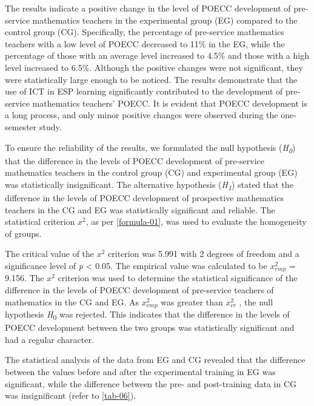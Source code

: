 The results indicate a positive change in the level of POECC development
of pre-service mathematics teachers in the experimental group (EG)
compared to the control group (CG). Specifically, the percentage of
pre-service mathematics teachers with a low level of POECC decreased to
11\% in the EG, while the percentage of those with an average level
increased to 4.5\% and those with a high level increased to 6.5\%.
Although the positive changes were not significant, they were
statistically large enough to be noticed. The results demonstrate that
the use of ICT in ESP learning significantly contributed to the
development of pre-service mathematics teachers' POECC. It is evident
that POECC development is a long process, and only minor positive
changes were observed during the one-semester study.
	
To ensure the reliability of the results, we formulated the null
hypothesis (\emph{H}\textsubscript{\emph{0}}) that the difference in the
levels of POECC development of pre-service mathematics teachers in the
control group (CG) and experimental group (EG) was statistically
insignificant. The alternative hypothesis
(\emph{H}\textsubscript{\emph{1}}) stated that the difference in the
levels of POECC development of prospective mathematics teachers in the
CG and EG was statistically significant and reliable. The statistical
criterion $x^{2}$, as per \cref{formula-01}, was used to evaluate the homogeneity of groups.
	
The critical value of the $x^{2}$ criterion was 5.991 with 2 degrees of freedom
and a significance level of \emph{p} \textless{} 0.05. The empirical
value was calculated to be $x_{emp}^{2}$ = 9.156. The $x^{2}$ criterion was used to determine
the statistical significance of the difference in the levels of POECC
development of pre-service teachers of mathematics in the CG and EG. As
$x_{emp}^{2}$ was greater than $x_{cr}^{2}$ , the null hypothesis \emph{H}\textsubscript{0} was
rejected. This indicates that the difference in the levels of POECC
development between the two groups was statistically significant and had
a regular character.

The statistical analysis of the data from EG and CG revealed that the
difference between the values before and after the experimental training
in EG was significant, while the difference between the pre- and
post-training data in CG was insignificant (refer to \cref{tab-06}).
	
